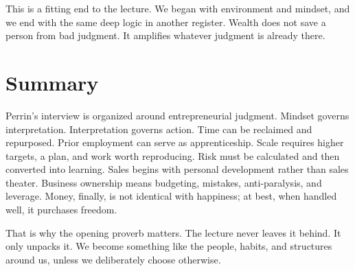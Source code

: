 This is a fitting end to the lecture. We began with environment and mindset, and we end with the same deep logic in another register. Wealth does not save a person from bad judgment. It amplifies whatever judgment is already there.

\section{Summary}

Perrin's interview is organized around entrepreneurial judgment. Mindset governs interpretation. Interpretation governs action. Time can be reclaimed and repurposed. Prior employment can serve as apprenticeship. Scale requires higher targets, a plan, and work worth reproducing. Risk must be calculated and then converted into learning. Sales begins with personal development rather than sales theater. Business ownership means budgeting, mistakes, anti-paralysis, and leverage. Money, finally, is not identical with happiness; at best, when handled well, it purchases freedom.

That is why the opening proverb matters. The lecture never leaves it behind. It only unpacks it. We become something like the people, habits, and structures around us, unless we deliberately choose otherwise.